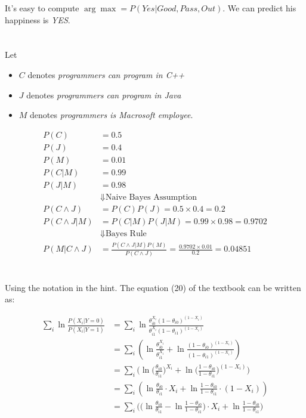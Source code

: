 \documentclass[12pt, letterpaper]{article}
\begin{document}
It's easy to compute $\arg\max = P(Yes|Good, Pass, Out)$. We can predict his happiness is \emph{YES}.

\section{}

Let 
\begin{itemize}
\item $C$ denotes \emph{programmers can program in C++}
\item $J$ denotes \emph{programmers can program in Java}
\item $M$ denotes \emph{programmers is Macrosoft employee}.
\end{itemize}

\begin{align*}
P(C)&=0.5\\
P(J)&=0.4\\
P(M)&=0.01\\
P(C|M)&=0.99\\
P(J|M)&=0.98\\
&\Downarrow\text{Naive Bayes Assumption}\\
P(C \land J)&=P(C)P(J)=0.5\times0.4=0.2\\
P(C \land J | M)&=P(C | M)P(J | M)=0.99\times0.98=0.9702\\
&\Downarrow\text{Bayes Rule}\\
P(M|C\land J)&=\frac{P(C\land J | M)P(M)}{P(C \land J)}=\frac{0.9702\times0.01}{0.2}=0.04851
\end{align*}

\section{}

Using the notation in the hint. The equation (20) of the textbook can be
written as:

\begin{align*}
\sum_i\ln\frac{P(X_i|Y=0)}{P(X_i|Y=1)}
&=\sum_i\ln\frac{\theta_{i0}^{X_i}(1-\theta_{i0})^{(1-X_i)}}{\theta_{i1}^{X_i}(1-\theta_{i1})^{(1-X_i)}}\\
&=\sum_i\left(\ln\frac{\theta_{i0}^{X_i}}{\theta_{i1}^{X_i}}+\ln\frac{(1-\theta_{i0})^{(1-X_i)}}{(1-\theta_{i1})^{(1-X_i)}}\right)\\
&=\sum_i\Bigg(\ln\bigg(\frac{\theta_{i0}}{\theta_{i1}}\bigg)^{X_i}+\ln\bigg(\frac{1-\theta_{i0}}{1-\theta_{i1}}\bigg)^{(1-X_i)}\Bigg)\\
&=\sum_i\left(\ln\frac{\theta_{i0}}{\theta_{i1}}\cdot{X_i}+\ln\frac{1-\theta_{i0}}{1-\theta_{i1}}\cdot{(1-X_i)}\right)\\
&=\sum_i\Bigg(\bigg(\ln\frac{\theta_{i0}}{\theta_{i1}}-\ln\frac{1-\theta_{i0}}{1-\theta_{i1}}\bigg)\cdot{X_i}+\ln\frac{1-\theta_{i0}}{1-\theta_{i1}}\Bigg)
\end{align*}
\end{document}
